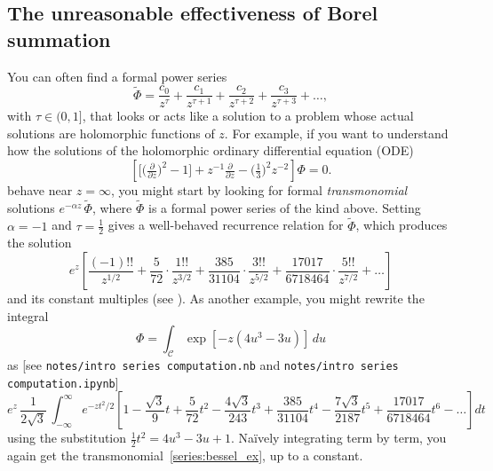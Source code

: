 \documentclass{article}
\newcommand{\series}[1]{\tilde{#1}}
\theoremstyle{definition}
\theoremstyle{plain}
\newenvironment{verify}{\color{ForestGreen}}{\color{black}}
\begin{document}
\subsection{The unreasonable effectiveness of Borel summation}\label{intro:summation}
You can often find a formal power series %
\[ \series{\Phi} = \frac{c_0}{z^\tau} + \frac{c_1}{z^{\tau+1}} + \frac{c_2}{z^{\tau+2}} + \frac{c_3}{z^{\tau+3}} + \ldots, \]
with $\tau \in (0, 1]$, that looks or acts like a solution to a problem whose actual solutions are holomorphic functions of $z$. For example, if you want to understand how the solutions of the holomorphic ordinary differential equation (ODE)
\begin{equation}
\left[ \big[ \big(\tfrac{\partial}{\partial z}\big)^2 - 1 \big] + z^{-1} \tfrac{\partial}{\partial z} - \big(\tfrac{1}{3}\big)^2 z^{-2} \right] \Phi= 0. \label{eqn:bessel_rescaled_ex}
\end{equation}
behave near $z = \infty$, you might start by looking for formal {\em transmonomial} solutions $e^{-\alpha z}\,\series{\Phi}$, where $\series{\Phi}$ is a formal power series of the kind above. Setting $\alpha = -1$ and $\tau = \tfrac{1}{2}$ gives a well-behaved recurrence relation for $\series{\Phi}$, which produces the solution 
\begin{equation}
e^{z} \left[ \frac{(-1)!!}{z^{1/2}} + \frac{5}{72} \cdot \frac{1!!}{z^{3/2}} + \frac{385}{31104} \cdot \frac{3!!}{z^{5/2}} + \frac{17017}{6718464} \cdot \frac{5!!}{z^{7/2}} + \ldots \right] \label{series:bessel_ex}
\end{equation}
and its constant multiples (see \cite[equation 10.40.1]{dlmf}). As another example, you might rewrite the integral
\begin{equation}\label{int:bessel_ex}
\Phi = \int_{\mathcal{C}} \exp\left[-z \left(4 u^3 - 3 u\right)\right]\,du
\end{equation}
as \begin{verify}[see \texttt{notes/intro series computation.nb} and \texttt{notes/intro series computation.ipynb}]\end{verify}
\[ e^{z}\, \frac{1}{2\sqrt{3}}\, \int_{-\infty}^\infty e^{-z t^2/2} \left[ 1 - \frac{\sqrt{3}}{9} t + \frac{5}{72} t^2 - \frac{4\sqrt{3}}{243} t^3 + \frac{385}{31104} t^4 - \frac{7\sqrt{3}}{2187} t^5 + \frac{17017}{6718464} t^6 - \ldots \right] dt \]
using the substitution $\tfrac{1}{2} t^2 = 4u^3 - 3u + 1$. Na\"{i}vely integrating term by term, you again get the transmonomial~\eqref{series:bessel_ex}, up to a constant.
\end{document}
